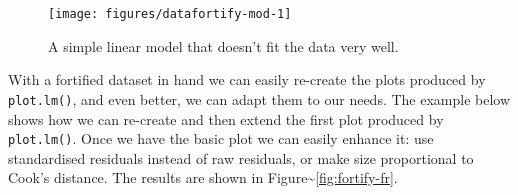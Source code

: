 \begin{Shaded}
\begin{Highlighting}[]
 \StringTok{ }\NormalTok{(} \NormalTok{)}
\StringTok{ }\StringTok{ } 
\end{Highlighting}
\end{Shaded}

\begin{figure}

{\centering \texttt{[image: figures/datafortify-mod-1]} 

}

\caption{A simple linear model that doesn't fit the data very well.\label{fig:fortify-mod}}
\end{figure}

With a fortified dataset in hand we can easily re-create the plots
produced by \texttt{plot.lm()}, and even better, we can adapt them to
our needs. The example below shows how we can re-create and then extend
the first plot produced by \texttt{plot.lm()}. Once we have the basic
plot we can easily enhance it: use standardised residuals instead of raw
residuals, or make size proportional to Cook's distance. The results are
shown in Figure\textasciitilde{}\ref{fig:fortify-fr}.

\begin{Shaded}
\begin{Highlighting}[]
\StringTok{ }\StringTok{ } 
\StringTok{ }
\StringTok{  }\NormalTok{(} \NormalTok{, } \NormalTok{, } \NormalTok{) +}\StringTok{ }
\StringTok{  }\NormalTok{() +}\StringTok{ }
\StringTok{  }\NormalTok{(} \NormalTok{, } 
\StringTok{ }\NormalTok{(} 
\StringTok{ }\NormalTok{(} \StringTok{ }\NormalTok{(}\NormalTok{)}
\end{Highlighting}
\end{Shaded}


